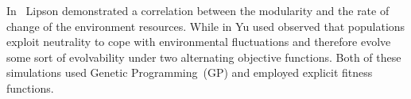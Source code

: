 
In~\citep{lipson2002origin} Lipson demonstrated a correlation between the modularity and the rate of change of the environment resources. While in \citep{yu2007program} Yu used observed that populations exploit neutrality to cope with environmental fluctuations and therefore evolve some sort of evolvability under two alternating objective functions. Both of these simulations used Genetic Programming~(GP) and employed explicit fitness functions.


